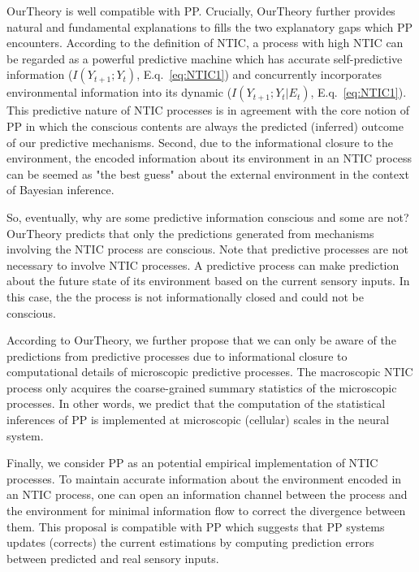 \documentclass[utf8]{article}
\begin{document}
    		\ac{OurTheory} is well compatible with PP. Crucially, \ac{OurTheory} further provides natural and fundamental explanations to fills the two explanatory gaps which PP encounters. According to the definition of NTIC, a process with high NTIC can be regarded as a powerful predictive machine which has accurate self-predictive information ($I(Y_{t+1};Y_{t})$, E.q.~\ref{eq:NTIC1}) and concurrently incorporates environmental information into its dynamic ($I(Y_{t+1};Y_{t}|E_{t})$, E.q.~\ref{eq:NTIC1}). This predictive nature of NTIC processes is in agreement with the core notion of PP in which the conscious contents are always the predicted (inferred) outcome of our predictive mechanisms. Second, due to the informational closure to the environment, the encoded information about its environment in an NTIC process can be seemed as "the best guess" about the external environment in the context of Bayesian inference. 
    		
    		So, eventually, why are some predictive information conscious and some are not? \ac{OurTheory} predicts that only the predictions generated from mechanisms involving the NTIC process are conscious. Note that predictive processes are not necessary to involve NTIC processes. A predictive process can make prediction about the future state of its environment based on the current sensory inputs. In this case, the the process is not informationally closed and could not be conscious.
    		
            According to \ac{OurTheory}, we further propose that we can only be aware of the predictions from predictive processes due to informational closure to computational details of microscopic predictive processes. The macroscopic NTIC process only acquires the coarse-grained summary statistics of the microscopic processes. In other words, we predict that the computation of the statistical inferences of PP is implemented at microscopic (cellular) scales in the neural system. 
        
    		Finally, we consider PP as an potential empirical implementation of NTIC processes. To maintain accurate information about the environment encoded in an NTIC process, one can open an information channel between the process and the environment for minimal information flow to correct the divergence between them. This proposal is compatible with PP which suggests that PP systems updates (corrects) the current estimations by computing prediction errors between predicted and real sensory inputs. 
\end{document}
